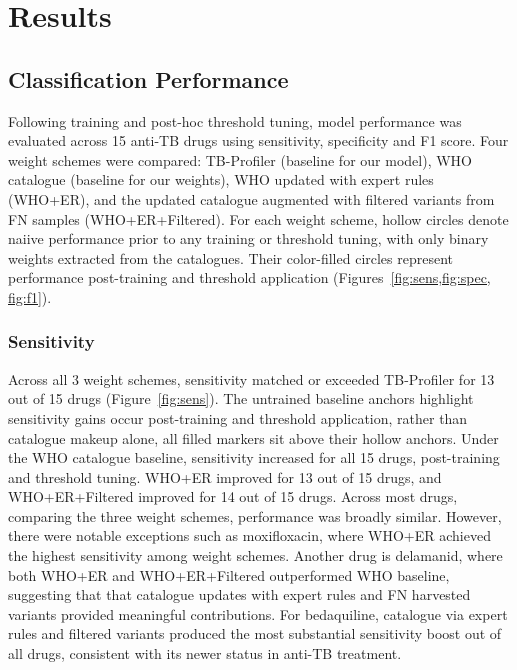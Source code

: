 \graphicspath{{Figures/Results}}
\sloppy

\chapter{Results}\label{ch:results}

\section{Classification Performance}\label{results:sec:model_perf}
Following training and post-hoc threshold tuning, model performance was evaluated across 15 anti-TB drugs using sensitivity, specificity and F1 score. Four weight schemes were compared: TB-Profiler (baseline for our model), WHO catalogue (baseline for our weights), WHO updated with expert rules (WHO+ER), and the updated catalogue augmented with filtered variants from FN samples (WHO+ER+Filtered). For each weight scheme, hollow circles denote naiive performance prior to any training or threshold tuning, with only binary weights extracted from the catalogues. Their color-filled circles represent performance post-training and threshold application (Figures~\ref{fig:sens,fig:spec, fig:f1}).

\subsection*{Sensitivity}
Across all 3 weight schemes, sensitivity matched or exceeded TB-Profiler for 13 out of 15 drugs (Figure~\ref{fig:sens}). The untrained baseline anchors highlight sensitivity gains occur post-training and threshold application, rather than catalogue makeup alone, all filled markers sit above their hollow anchors. Under the WHO catalogue baseline, sensitivity increased for all 15 drugs, post-training and threshold tuning. WHO+ER improved for 13 out of 15 drugs, and WHO+ER+Filtered improved for 14 out of 15 drugs. Across most drugs, comparing the three weight schemes, performance was broadly similar. However, there were notable exceptions such as moxifloxacin, where WHO+ER achieved the highest sensitivity among weight schemes. Another drug is delamanid, where both WHO+ER and WHO+ER+Filtered outperformed WHO baseline, suggesting that that catalogue updates with expert rules and FN harvested variants provided meaningful contributions. For bedaquiline, catalogue via expert rules and filtered variants produced the most substantial sensitivity boost out of all drugs, consistent with its newer status in anti-TB treatment.

